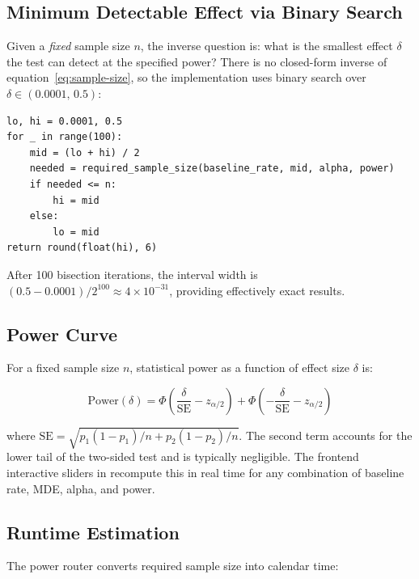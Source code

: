 \subsection{Minimum Detectable Effect via Binary Search}

Given a \emph{fixed} sample size $n$, the inverse question is: what is the
smallest effect $\delta$ the test can detect at the specified power? There is no
closed-form inverse of equation~\eqref{eq:sample-size}, so the implementation
uses binary search over $\delta \in (0.0001,\, 0.5)$:

\begin{lstlisting}[style=python, caption={minimum\_detectable\_effect (stats\_engine.py lines 294--302)}]
lo, hi = 0.0001, 0.5
for _ in range(100):
    mid = (lo + hi) / 2
    needed = required_sample_size(baseline_rate, mid, alpha, power)
    if needed <= n:
        hi = mid
    else:
        lo = mid
return round(float(hi), 6)
\end{lstlisting}

After 100 bisection iterations, the interval width is
$(0.5 - 0.0001)/2^{100} \approx 4 \times 10^{-31}$, providing effectively
exact results.

\subsection{Power Curve}

For a fixed sample size $n$, statistical power as a function of effect size
$\delta$ is:

\begin{equation}
  \mathrm{Power}(\delta) = \Phi\!\left(\frac{\delta}{\mathrm{SE}} - z_{\alpha/2}\right)
    + \Phi\!\left(-\frac{\delta}{\mathrm{SE}} - z_{\alpha/2}\right)
  \label{eq:power-curve}
\end{equation}

where $\mathrm{SE} = \sqrt{p_1(1-p_1)/n + p_2(1-p_2)/n}$. The second term
accounts for the lower tail of the two-sided test and is typically negligible.
The frontend interactive sliders in  recompute
this in real time for any combination of baseline rate, MDE, alpha, and power.

\subsection{Runtime Estimation}

The power router converts required sample size into calendar time:

